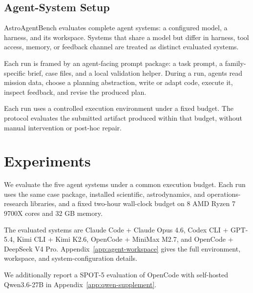 \documentclass[]{mosi}
\begin{document}
\subsection{Agent-System Setup}
\label{sec:agent-system-setup}

AstroAgentBench evaluates complete agent systems: a configured model, a harness, and its workspace. Systems that share a model but differ in harness, tool access, memory, or feedback channel are treated as distinct evaluated systems.

Each run is framed by an agent-facing prompt package: a task prompt, a family-specific brief, case files, and a local validation helper. During a run, agents read mission data, choose a planning abstraction, write or adapt code, execute it, inspect feedback, and revise the produced plan.

Each run uses a controlled execution environment under a fixed budget. The protocol evaluates the submitted artifact produced within that budget, without manual intervention or post-hoc repair.

\section{Experiments}
\label{sec:experiments}

We evaluate the five agent systems under a common execution budget. Each run uses the same case package, installed scientific, astrodynamics, and operations-research libraries, and a fixed two-hour wall-clock budget on 8 AMD Ryzen 7 9700X cores and 32 GB memory.

The evaluated systems are Claude Code + Claude Opus 4.6, Codex CLI + GPT-5.4, Kimi CLI + Kimi K2.6, OpenCode + MiniMax M2.7, and OpenCode + DeepSeek V4 Pro. Appendix~\ref{app:agent-workspace} gives the full environment, workspace, and system-configuration details.

We additionally report a SPOT-5 evaluation of OpenCode with self-hosted Qwen3.6-27B in Appendix~\ref{app:qwen-supplement}.
\end{document}
